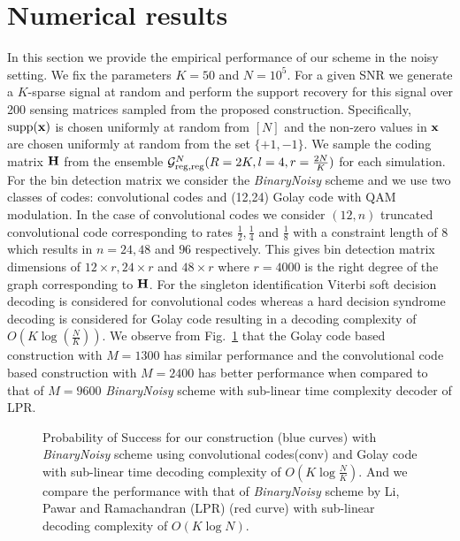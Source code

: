 \section{Numerical results}
In this section we provide the empirical performance of our scheme in the noisy setting. We fix the parameters $K=50$ and $N=10^5$. For a given SNR we generate a $K$-sparse signal at random and perform the support recovery for this signal over 200 sensing matrices sampled from the proposed construction. Specifically, $\text{supp}(\mathbf{x})$ is chosen uniformly at random from $[N]$ and the non-zero values in $\mathbf{x}$ are chosen uniformly at random from the set $\{+1,-1\}$. We sample the coding matrix $\mathbf{H}$ from the ensemble $\mathcal{G}_{\text{reg,reg}}^{N}(R=2K,l=4,r=\frac{2N}{K})$ for each simulation. For the bin detection matrix we consider the \emph{BinaryNoisy} scheme and we use two classes of codes: convolutional codes and (12,24) Golay code with QAM modulation. In the case of convolutional codes we consider $(12,n)$ truncated convolutional code corresponding to rates $\frac{1}{2},\frac{1}{4}$ and $\frac{1}{8}$ with a constraint length of $8$ which results in $n=24,48$ and $96$ respectively. This gives bin detection matrix dimensions of $12\times r, 24\times r$ and $48\times r$ where $r=4000$ is the right degree of the graph corresponding to $\mathbf{H}$. For the singleton identification Viterbi soft decision decoding is considered for convolutional codes whereas a hard decision syndrome decoding is considered for Golay code resulting in a decoding complexity of $O\left(K\log\left(\frac{N}{K}\right)\right)$. We observe from Fig.~\ref{Fig:Sims} that the Golay code based construction with $M=1300$ has similar performance and the convolutional code based construction with $M=2400$ has better performance when compared to that of  $M=9600$ \emph{BinaryNoisy} scheme with sub-linear time complexity decoder of LPR\cite{li2015subisit}. %

\begin{figure}
\resizebox{0.95\textwidth}{!}{
\begin{centering}

\end{centering}
}
\caption{Probability of Success for our construction (blue curves) with \emph{BinaryNoisy} scheme using convolutional codes(conv) and Golay code with sub-linear time decoding complexity of $O(K\log \frac{N}{K})$.%
 And we compare the performance with that of \emph{BinaryNoisy} scheme by Li, Pawar and Ramachandran (LPR) (red curve) \cite{li2015subdraft} with sub-linear decoding complexity of $O\left( K \log N\right)$.} %

\label{Fig:Sims}	
\end{figure}

